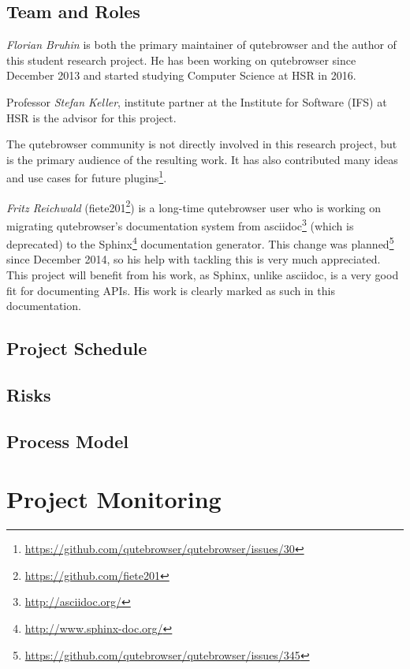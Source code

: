 \documentclass[a4paper,parskip=full]{scrreprt}
\begin{document}
\section{Team and Roles}
\emph{Florian Bruhin} is both the primary maintainer of qutebrowser and the
author of this student research project. He has been working on qutebrowser since
December 2013 and started studying Computer Science at HSR in 2016.

Professor \emph{Stefan Keller}, institute partner at the Institute for Software
(IFS) at HSR is the advisor for this project.

The qutebrowser community is not directly involved in this research project, but
is the primary audience of the resulting work. It has also contributed many
ideas and use cases for future
plugins\footnote{\url{https://github.com/qutebrowser/qutebrowser/issues/30}}.

\label{fiete}
\emph{Fritz Reichwald} (fiete201\footnote{\url{https://github.com/fiete201}})
is a long-time qutebrowser user who is working on migrating qutebrowser's
documentation system from asciidoc\footnote{\url{http://asciidoc.org/}} (which
is deprecated) to the Sphinx\footnote{\url{http://www.sphinx-doc.org/}}
documentation generator. This change was
planned\footnote{\url{https://github.com/qutebrowser/qutebrowser/issues/345}}
since December 2014, so his help with tackling this is very much appreciated.
This project will benefit from his work, as Sphinx, unlike asciidoc, is a
very good fit for documenting APIs. His work is clearly marked as such in this
documentation.

\section{Project Schedule}
\section{Risks}
\section{Process Model}


\chapter{Project Monitoring}
\end{document}
